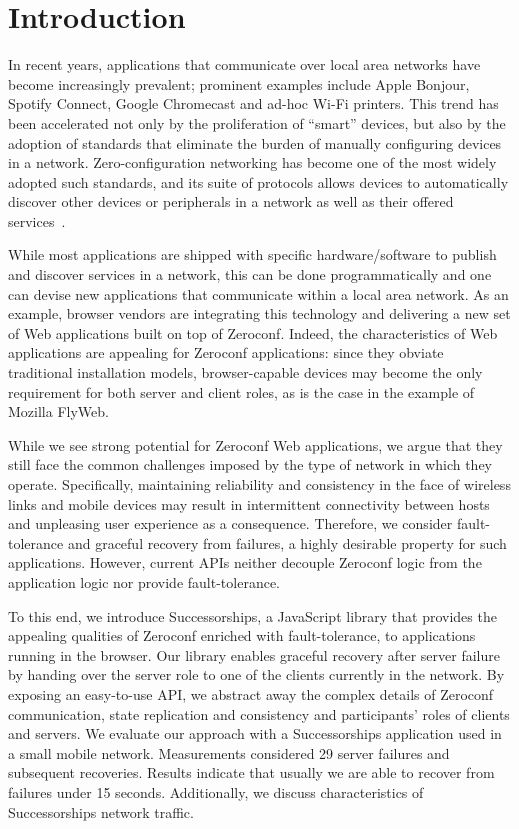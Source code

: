 \section{Introduction}
\label{sec:introduction}

In recent years, applications that communicate over local area networks have become increasingly prevalent; prominent examples include Apple Bonjour, Spotify Connect, Google Chromecast and ad-hoc Wi-Fi printers.
This trend has been accelerated not only by the proliferation of ``smart'' devices, but also by the adoption of standards that eliminate the burden of manually configuring devices in a network.
Zero-configuration networking has become one of the most widely adopted such standards, and its suite of protocols allows devices to automatically discover other devices or peripherals in a network as well as their offered services~\cite{rfc6762, rfc6763}.

While most applications are shipped with specific hardware/software to publish and discover services in a network, this can be done programmatically and one can devise new applications that communicate within a local area network.
As an example, browser vendors are integrating this technology and delivering a new set of Web applications built on top of Zeroconf.
Indeed, the characteristics of Web applications are appealing for Zeroconf applications: since they obviate traditional installation models, browser-capable devices may become the only requirement for both server and client roles, as is the case in the example of Mozilla FlyWeb.

While we see strong potential for Zeroconf Web applications, we argue that they still face the common challenges imposed by the type of network in which they operate.
Specifically, maintaining reliability and consistency in the face of wireless links and mobile devices may result in intermittent connectivity between hosts and unpleasing user experience as a consequence.
Therefore, we consider fault-tolerance and graceful recovery from failures, a highly desirable property for such applications.
However, current APIs neither decouple Zeroconf logic from the application logic nor provide fault-tolerance.

To this end, we introduce Successorships, a JavaScript library that provides the appealing qualities of Zeroconf enriched with fault-tolerance, to applications running in the browser.
Our library enables graceful recovery after server failure by handing over the server role to one of the clients currently in the network.
By exposing an easy-to-use API, we abstract away the complex details of Zeroconf communication, state replication and consistency and participants' roles of clients and servers.
We evaluate our approach with a Successorships application used in a small mobile network.
Measurements considered 29 server failures and subsequent recoveries.
Results indicate that usually we are able to recover from failures under 15 seconds.
Additionally, we discuss characteristics of Successorships network traffic.

